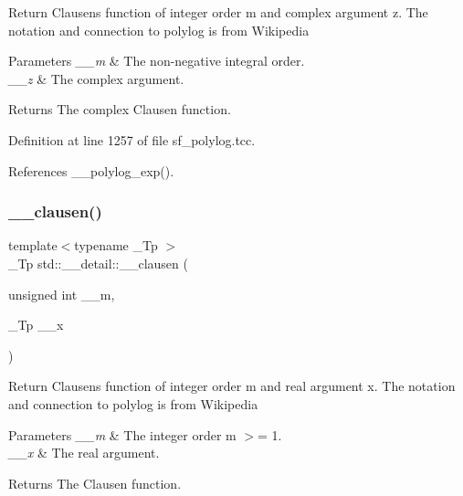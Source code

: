 Return Clausen\textquotesingle{}s function of integer order m and complex argument {\ttfamily z}. The notation and connection to polylog is from Wikipedia


\begin{DoxyParams}{Parameters}
{\em \+\_\+\+\_\+m} & The non-\/negative integral order. \\
\hline
{\em \+\_\+\+\_\+z} & The complex argument. \\
\hline
\end{DoxyParams}
\begin{DoxyReturn}{Returns}
The complex Clausen function. 
\end{DoxyReturn}


Definition at line 1257 of file sf\+\_\+polylog.\+tcc.



References \+\_\+\+\_\+polylog\+\_\+exp().

\mbox{\label{namespacestd_1_1____detail_a07d0f6b515fec03e423e5cecbb7580cd}} 
\subsubsection{\texorpdfstring{\+\_\+\+\_\+clausen()}{\_\_clausen()}\hspace{0.1cm}{\footnotesize\ttfamily [2/2]}}
{\footnotesize\ttfamily template$<$typename \+\_\+\+Tp $>$ \\
\+\_\+\+Tp std\+::\+\_\+\+\_\+detail\+::\+\_\+\+\_\+clausen (\begin{DoxyParamCaption}\item[{unsigned int}]{\+\_\+\+\_\+m,  }\item[{\+\_\+\+Tp}]{\+\_\+\+\_\+x }\end{DoxyParamCaption})}

Return Clausen\textquotesingle{}s function of integer order m and real argument x. The notation and connection to polylog is from Wikipedia


\begin{DoxyParams}{Parameters}
{\em \+\_\+\+\_\+m} & The integer order m $>$= 1. \\
\hline
{\em \+\_\+\+\_\+x} & The real argument. \\
\hline
\end{DoxyParams}
\begin{DoxyReturn}{Returns}
The Clausen function. 
\end{DoxyReturn}


